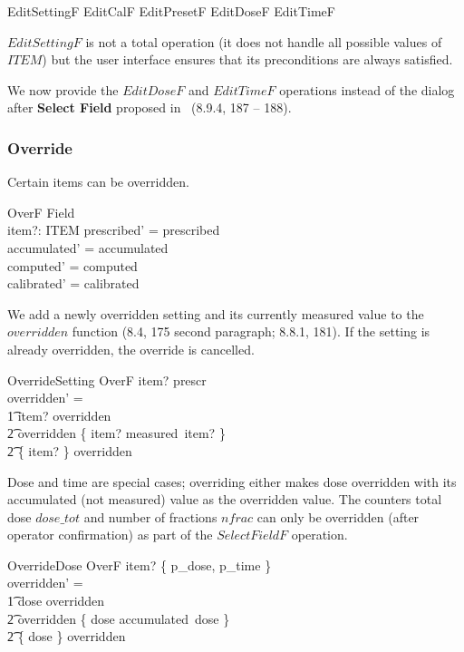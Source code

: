 \documentclass{article}
\begin{document}
\begin{zed}
EditSettingF  
 EditCalF \lor EditPresetF \lor EditDoseF \lor EditTimeF
\end{zed}
$EditSettingF$ is not a total operation (it does not handle all
possible values of $ITEM$) but the user interface ensures that
its preconditions are always satisfied.

We now provide the $EditDoseF$ and $EditTimeF$ operations instead of
the dialog after {\bf Select Field} proposed in~\cite{jacky92}
(8.9.4, 187 -- 188).

\subsubsection{Override}

Certain items can be overridden.

\begin{schema}{OverF}
	\Delta Field \\
	item?: ITEM 
\where
	prescribed' = prescribed \\
	accumulated' = accumulated \\
	computed' = computed \\
	calibrated' = calibrated
\end{schema}
We add a newly overridden setting and its currently measured value
to the $overridden$ function (8.4, 175 second paragraph; 8.8.1, 181).
If the setting is already overridden, the override is cancelled.

\begin{schema}{OverrideSetting}
	OverF
\where
	item? \in prescr \\
overridden' = \\
\t1 \IF item? \notin \dom overridden \\
\t2	\THEN overridden \oplus \{ item? \mapsto measured~item? \} \\
\t2	\ELSE \{ item? \} \ndres overridden
\end{schema}
Dose and time are special cases; overriding either makes dose
overridden with its accumulated (not measured) value as
the overridden value.  The counters 
total dose $dose\_tot$ and number of fractions
$nfrac$ can only be overridden (after operator confirmation) as part
of the $SelectFieldF$ operation.

\begin{schema}{OverrideDose}
	OverF
\where
	item? \in \{ p\_dose, p\_time \} \\
overridden' = \\
\t1 \IF dose \notin \dom overridden \\
\t2	\THEN overridden \oplus \{ dose \mapsto accumulated~dose \} \\
\t2	\ELSE \{ dose \} \ndres overridden
\end{schema}
\end{document}
